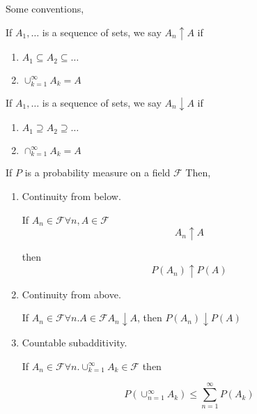 \documentclass[11pt,fleqn]{book} %
\begin{document}
Some conventions, 

If $A_1, \dots$ is a sequence of sets, we say $A_n \uparrow A$ if 

\begin{enumerate}
 	\item $A_1 \subseteq A_2 \subseteq \dots$
 	\item $\displaystyle \cup^\infty_{k=1} A_k = A$
 \end{enumerate} 
\vspace{5mm}
 If $A_1, \dots$ is a sequence of sets, we say $A_n \downarrow A$ if 

\begin{enumerate}
 	\item $A_1 \supseteq A_2 \supseteq \dots$
 	\item $\displaystyle \cap^\infty_{k=1} A_k = A$
 \end{enumerate} 

 \begin{theorem}
 	If $P$ is a probability measure on a field $\mathscr{F}$ Then, 

 	\begin{enumerate}
 		\item Continuity from below.

 		If $A_n \in \mathscr{F} \forall n, A \in \mathscr{F}$
 		$$ A_n \uparrow A$$

 		then $$P(A_n) \uparrow P(A)$$

 		\item Continuity from above.

 		If $A_n \in \mathscr{F} \forall n. A \in \mathscr{F} A_n \downarrow A$, then $P(A_n) \downarrow P(A)$

 		\item Countable subadditivity.

 		If $A_n \in \mathscr{F} \forall n. \displaystyle \cup^\infty_{k=1} A_k \in \mathscr{F}$ then 

 		$$P(\displaystyle \cup^\infty_{n=1} A_k) \leq \displaystyle \sum^\infty_{n=1} P(A_k)$$
 	\end{enumerate}
 \end{theorem}
\end{document}
